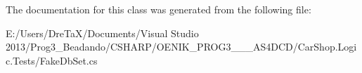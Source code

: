 The documentation for this class was generated from the following file\+:\begin{DoxyCompactItemize}
\item 
E\+:/\+Users/\+Dre\+Ta\+X/\+Documents/\+Visual Studio 2013/\+Prog3\+\_\+\+Beadando/\+C\+S\+H\+A\+R\+P/\+O\+E\+N\+I\+K\+\_\+\+P\+R\+O\+G3\+\_\+\_\+\_\+\+A\+S4\+D\+C\+D/\+Car\+Shop.\+Logic.\+Tests/Fake\+Db\+Set.\+cs\end{DoxyCompactItemize}
